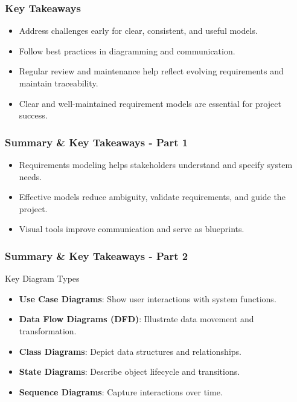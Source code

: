 \documentclass{beamer}
\begin{document}
\begin{frame}[fragile]
\frametitle{Key Takeaways}
\begin{itemize}
    \item Address challenges early for clear, consistent, and useful models.
    \item Follow best practices in diagramming and communication.
    \item Regular review and maintenance help reflect evolving requirements and maintain traceability.
    \item Clear and well-maintained requirement models are essential for project success.
\end{itemize}
\end{frame}

\begin{frame}[fragile]
    \frametitle{Summary & Key Takeaways - Part 1}
    \begin{itemize}
        \item Requirements modeling helps stakeholders understand and specify system needs.
        \item Effective models reduce ambiguity, validate requirements, and guide the project.
        \item Visual tools improve communication and serve as blueprints.
    \end{itemize}
\end{frame}

\begin{frame}[fragile]
    \frametitle{Summary & Key Takeaways - Part 2}
    \begin{block}{Key Diagram Types}
        \begin{itemize}
            \item \textbf{Use Case Diagrams}: Show user interactions with system functions.
            \item \textbf{Data Flow Diagrams (DFD)}: Illustrate data movement and transformation.
            \item \textbf{Class Diagrams}: Depict data structures and relationships.
            \item \textbf{State Diagrams}: Describe object lifecycle and transitions.
            \item \textbf{Sequence Diagrams}: Capture interactions over time.
        \end{itemize}
    \end{block}
\end{frame}
\end{document}
